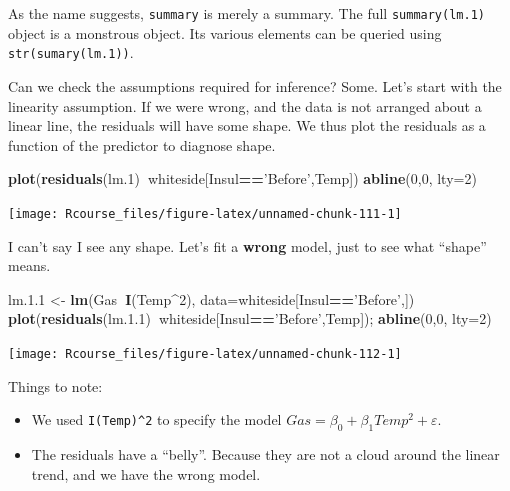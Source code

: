 \documentclass[]{book}
\newenvironment{Shaded}{\begin{snugshade}}{\end{snugshade}}
\newcommand{\KeywordTok}[1]{\textcolor[rgb]{0.13,0.29,0.53}{\textbf{#1}}}
\newcommand{\DataTypeTok}[1]{\textcolor[rgb]{0.13,0.29,0.53}{#1}}
\newcommand{\DecValTok}[1]{\textcolor[rgb]{0.00,0.00,0.81}{#1}}
\newcommand{\FloatTok}[1]{\textcolor[rgb]{0.00,0.00,0.81}{#1}}
\newcommand{\StringTok}[1]{\textcolor[rgb]{0.31,0.60,0.02}{#1}}
\newcommand{\OperatorTok}[1]{\textcolor[rgb]{0.81,0.36,0.00}{\textbf{#1}}}
\newcommand{\NormalTok}[1]{#1}
\providecommand{\tightlist}{%
  \setlength{\itemsep}{0pt}\setlength{\parskip}{0pt}}
\theoremstyle{definition}
\theoremstyle{definition}
\theoremstyle{definition}
\theoremstyle{remark}
\begin{document}
As the name suggests, \texttt{summary} is merely a summary. The full
\texttt{summary(lm.1)} object is a monstrous object. Its various
elements can be queried using \texttt{str(sumary(lm.1))}.

Can we check the assumptions required for inference? Some. Let's start
with the linearity assumption. If we were wrong, and the data is not
arranged about a linear line, the residuals will have some shape. We
thus plot the residuals as a function of the predictor to diagnose
shape.

\begin{Shaded}
\begin{Highlighting}[]
\KeywordTok{plot}\NormalTok{(}\KeywordTok{residuals}\NormalTok{(lm.}\DecValTok{1}\NormalTok{)}\OperatorTok{~}\NormalTok{whiteside[Insul}\OperatorTok{==}\StringTok{'Before'}\NormalTok{,Temp])}
\KeywordTok{abline}\NormalTok{(}\DecValTok{0}\NormalTok{,}\DecValTok{0}\NormalTok{, }\DataTypeTok{lty=}\DecValTok{2}\NormalTok{)}
\end{Highlighting}
\end{Shaded}

\texttt{[image: Rcourse\_files/figure-latex/unnamed-chunk-111-1]}

I can't say I see any shape. Let's fit a \textbf{wrong} model, just to
see what ``shape'' means.

\begin{Shaded}
\begin{Highlighting}[]
\NormalTok{lm.}\FloatTok{1.1}\NormalTok{ <-}\StringTok{ }\KeywordTok{lm}\NormalTok{(Gas}\OperatorTok{~}\KeywordTok{I}\NormalTok{(Temp}\OperatorTok{^}\DecValTok{2}\NormalTok{), }\DataTypeTok{data=}\NormalTok{whiteside[Insul}\OperatorTok{==}\StringTok{'Before'}\NormalTok{,])}
\KeywordTok{plot}\NormalTok{(}\KeywordTok{residuals}\NormalTok{(lm.}\FloatTok{1.1}\NormalTok{)}\OperatorTok{~}\NormalTok{whiteside[Insul}\OperatorTok{==}\StringTok{'Before'}\NormalTok{,Temp]); }\KeywordTok{abline}\NormalTok{(}\DecValTok{0}\NormalTok{,}\DecValTok{0}\NormalTok{, }\DataTypeTok{lty=}\DecValTok{2}\NormalTok{)}
\end{Highlighting}
\end{Shaded}

\texttt{[image: Rcourse\_files/figure-latex/unnamed-chunk-112-1]}

Things to note:

\begin{itemize}
\tightlist
\item
  We used \texttt{I(Temp)\^{}2} to specify the model
  \(Gas=\beta_0 + \beta_1 Temp^2+ \varepsilon\).
\item
  The residuals have a ``belly''. Because they are not a cloud around
  the linear trend, and we have the wrong model.
\end{itemize}
\end{document}
